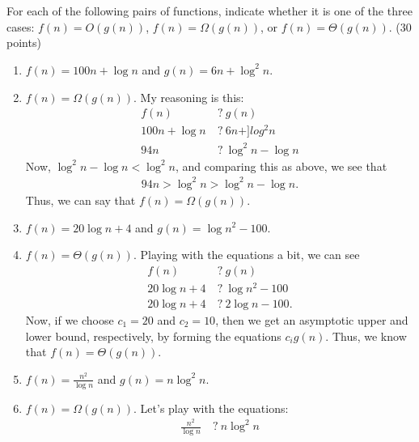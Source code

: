 \documentclass{article}
\begin{document}
\section{}
For each of the following pairs of functions, indicate whether it is
one of the three cases: $f (n) = O(g(n))$, $f (n) = \Omega(g(n))$, or
$f (n) = \Theta(g(n))$. (30 points)
\begin{enumerate}[label=(\alph*)]
\item $f (n) = 100n + \log n$ and $g(n) = 6n + \log^2 n$.
\item[] $f(n) = \Omega(g(n))$.  My reasoning is this:
  \begin{equation}
    \begin{split}
      f(n) &\: ?\: g(n)\\
      100n + \log n &\: ? \: 6n+]log^2 n\\
      94n &\: ?\: \log^2 n - \log n 
    \end{split}
  \end{equation}
Now, $\log^2 n - \log n < \log^2 n$, and comparing this as above, we
see that 
\begin{equation}
  \begin{split}
    94n > \log^2 n > \log^2 n -\log n.
  \end{split}
\end{equation}
Thus, we can say that $f(n) = \Omega(g(n))$.
\item $f (n) = 20 \log n + 4$ and $g(n) = \log n^2 - 100$.
\item[] $f(n) = \Theta(g(n))$.  Playing with the equations a bit, we
  can see
  \begin{equation}
    \begin{split}
      f(n) & \: ? \: g(n)\\
      20\log n + 4 &\: ? \: \log n^2 - 100\\
      20 \log n + 4 &\: ? \: 2\log n - 100.
    \end{split}
  \end{equation}
Now, if we choose $c_1 = 20$ and $c_2 = 10$, then we get an asymptotic
upper and lower bound, respectively, by forming the equations $c_i
g(n)$.  Thus, we know that $f(n) = \Theta(g(n))$.
\item $f (n) =\frac{n^2}{\log n}$ and $g(n) = n \log^2 n$.
\item[] $f(n) = \Omega(g(n))$. Let's play with the equations:
  \begin{equation}
    \begin{split}
      \frac{n^2}{\log n} &\: ? \: n \log^2 n\\

\end{split}
\end{equation}
\end{enumerate}
\end{document}
